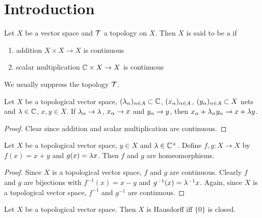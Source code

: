 \documentclass{book}
\begin{document}
	\section{Introduction}
	
	\begin{defn}
		Let $X$ be a vector space and $\mathcal{T}$ a topology on $X$. Then $X$ is said to be a  if
		\begin{enumerate}
			\item  addition $X \times X \rightarrow X$ is continuous  \item scalar multiplication $\mathbb{C} \times X \rightarrow X$ is continuous
		\end{enumerate}
	\end{defn}
	
	\begin{note}
		We usually suppress the topology $\mathcal{T}$.
	\end{note}

	\begin{ex}
		Let $X$ be a topological vector space, $(\lambda_{\alpha})_{\alpha \in A} \subset \mathbb{C}$, $(x_{\alpha})_{\alpha \in A}$, $(y_{\alpha})_{\alpha \in A} \subset X$ nets and $\lambda \in \mathbb{C}$, $x, y \in X$. If $\lambda_{\alpha} \rightarrow \lambda$, $x_{\alpha} \rightarrow x$ and $y_{\alpha} \rightarrow y$, then $x_{\alpha} + \lambda_{\alpha}y_{\alpha} \rightarrow x + \lambda y$.
	\end{ex}

	\begin{proof}
		Clear since addition and scalar multiplication are continuous.
	\end{proof}
	
	\begin{ex}
		Let $X$ be a topological vector space, $y \in X$ and $\lambda \in \mathbb{C}^{\times}$. Define $f,g: X \rightarrow X$ by $f(x) = x + y$ and $g(x) = \lambda x$. Then $f$ and $g$ are homeomorphisms. 
	\end{ex}
	
	\begin{proof}
		Since $X$ is a topological vector space, $f$ and $g$ are continuous. Clearly $f$ and $g$ are bijections with $f^{-1}(x) = x - y$ and $g^{-1}(x) = \lambda^{-1}x$. Again, since $X$ is a topological vector space, $f^{-1}$ and $g^{-1}$ are continuous.
	\end{proof}

	\begin{ex}
		Let $X$ be a topological vector space. Then $X$ is Hausdorff iff $\{0\}$ is closed.
	\end{ex}
\end{document}
